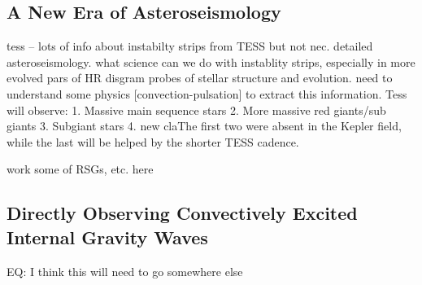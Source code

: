{\color{blue}
\subsection{A New Era of Asteroseismology}

tess -- lots of info about instabilty strips from TESS but not nec. detailed asteroseismology.  what science can we do with instablity strips, especially in more evolved pars of HR disgram  probes of stellar structure and evolution.   need to understand some physics [convection-pulsation] to extract this information.   Tess will observe: 1. Massive main sequence stars 2. More massive red giants/sub giants 3. Subgiant stars 4.  new claThe first two were absent in the Kepler field, while the last will be helped by the shorter TESS cadence.

work some of RSGs, etc. here

\subsection{Directly Observing Convectively Excited Internal Gravity Waves}

EQ: I think this will need to go somewhere else



}